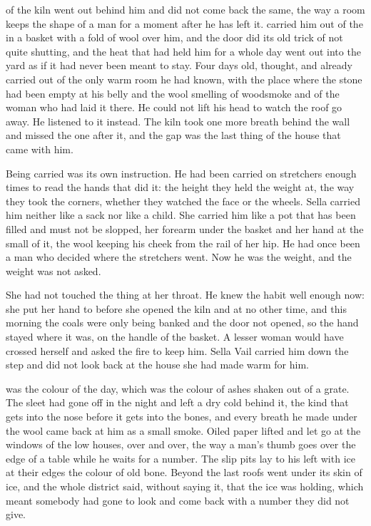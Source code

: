 
 of the kiln went out behind him and did not come back the same, the way a room keeps the shape of a man for a moment after he has left it.  carried him out of the  in a basket with a fold of wool over him, and the door did its old trick of not quite shutting, and the heat that had held him for a whole day went out into the yard as if it had never been meant to stay. Four days old,  thought, and already carried out of the only warm room he had known, with the place where the stone had been empty at his belly and the wool smelling of woodsmoke and of the woman who had laid it there. He could not lift his head to watch the roof go away. He listened to it instead. The kiln took one more breath behind the wall and missed the one after it, and the gap was the last thing of the house that came with him.

Being carried was its own instruction. He had been carried on stretchers enough times to read the hands that did it: the height they held the weight at, the way they took the corners, whether they watched the face or the wheels. Sella carried him neither like a sack nor like a child. She carried him like a pot that has been filled and must not be slopped, her forearm under the basket and her hand at the small of it, the wool keeping his cheek from the rail of her hip. He had once been a man who decided where the stretchers went. Now he was the weight, and the weight was not asked.

She had not touched the thing at her throat. He knew the habit well enough now: she put her hand to  before she opened the kiln and at no other time, and this morning the coals were only being banked and the door not opened, so the hand stayed where it was, on the handle of the basket. A lesser woman would have crossed herself and asked the fire to keep him. Sella Vail carried him down the step and did not look back at the house she had made warm for him.

 was the colour of the day, which was the colour of ashes shaken out of a grate. The sleet had gone off in the night and left a dry cold behind it, the kind that gets into the nose before it gets into the bones, and every breath he made under the wool came back at him as a small smoke. Oiled paper lifted and let go at the windows of the low houses, over and over, the way a man's thumb goes over the edge of a table while he waits for a number. The slip pits lay to his left with ice at their edges the colour of old bone. Beyond the last roofs  went under its skin of ice, and the whole district said, without saying it, that the ice was holding, which meant somebody had gone to look and come back with a number they did not give.

